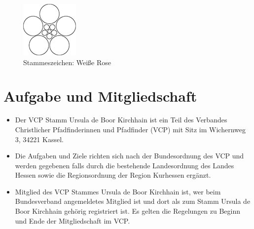 \documentclass[a4paper]{article}
\newcommand{\name}{Ursula de Boor\xspace}
\newcommand{\ort}{Kirchhain\xspace}
\begin{document}
\begin{figure}
    \vspace{-10pt}
    \centering
    \includegraphics[width=1\linewidth]{WeisseRose.png}
    \caption{Stammeszeichen: Weiße Rose}
\end{figure}
    
\section{Aufgabe und Mitgliedschaft}
\begin{itemize}
	\item Der VCP Stamm \name \ort ist ein Teil des Verbandes Christlicher Pfadfinderinnen und Pfadfinder (VCP) mit Sitz im Wichernweg 3, 34221 Kassel. 
	\item Die Aufgaben und Ziele richten sich nach der Bundesordnung des VCP und werden gegebenen falls durch die bestehende Landesordnung des Landes Hessen sowie die Regionsordnung der Region Kurhessen ergänzt. 
	\item Mitglied des VCP Stammes \name \ort ist, wer beim Bundesverband angemeldetes Mitglied ist und dort als zum Stamm \name \ort gehörig registriert ist. Es gelten die Regelungen zu Beginn und Ende der Mitgliedschaft im VCP. 
\end{itemize}
\end{document}
